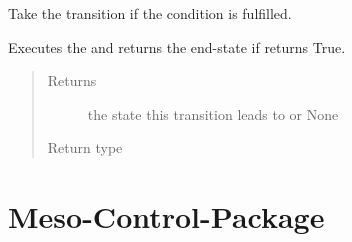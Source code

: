\documentclass[a4paper,12pt,english]{article}
\begin{document}
\begin{fulllineitems}
\begin{fulllineitems}
\begin{quote}
\begin{description}
\end{description}\end{quote}

\end{fulllineitems}


\begin{fulllineitems}
\label{\detokenize{osbk_operation:osbk_operation.utility.Transition.take}}
Take the transition if the condition is fulfilled.

Executes the  and returns the end-state if  returns True.
\begin{quote}\begin{description}
\item[{Returns}] \leavevmode
the state this transition leads to or None

\item[{Return type}] \leavevmode
{\hyperref[\detokenize{osbk_operation:osbk_operation.utility.State}]{}}

\end{description}\end{quote}

\end{fulllineitems}


\end{fulllineitems}



\chapter{Meso-Control-Package}
\label{\detokenize{meso_control_pkg:module-meso_control_pkg.meso_state_machine}}\label{\detokenize{meso_control_pkg:meso-control-package}}\label{\detokenize{meso_control_pkg::doc}}
\end{document}
